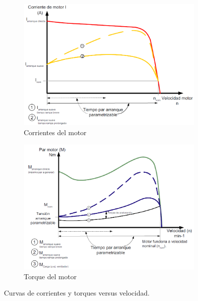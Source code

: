 \begin{figure}
	\centering
	\begin{subfigure}[b]{0.49\textwidth}
		\centering
		\includegraphics[width=\textwidth]{fig/CorrienteMotor}
		\caption{Corrientes del motor}
		\label{fig:corrientemotor}
	\end{subfigure}
	\hfill
	\begin{subfigure}[b]{0.49\textwidth}
		\centering
		\includegraphics[width=\textwidth]{fig/TorqueMotor}
		\caption{Torque del motor}
		\label{fig:torquemotor}
		
	\end{subfigure}
	\caption{Curvas de corrientes y torques versus velocidad.\cite{SIEMENS}}
\end{figure}



